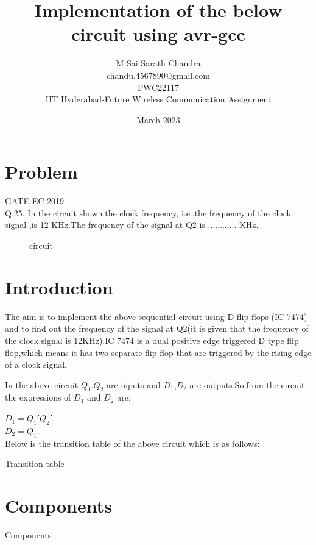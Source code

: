 \documentclass{article}
\title{Implementation of the below circuit using avr-gcc}
\date{March 2023}
\author{M Sai Sarath Chandra\\chandu.4567890@gmail.com\\FWC22117\\IIT Hyderabad-Future Wireless Communication Assignment}
\begin{document}
\maketitle
	\tableofcontents

\pagebreak

\section{Problem}
	{GATE EC-2019}\\
	Q.25. In the circuit shown,the clock frequency, i.e.,the frequency of the clock signal ,is 12 KHz.The frequency of the signal at Q2 is ............ KHz.
	\begin{figure}[h]
	\centering
		
		\caption{circuit}
		\label{fig:1}
	\end{figure}

\section{Introduction}
		
		The aim is to implement the above sequential circuit using D flip-flops (IC 7474) and to find out the frequency of the signal at Q2(it is given that the frequency of the clock signal is 12KHz).IC 7474 is a dual positive edge triggered D type flip flop,which means it has two separate flip-flop that are triggered by the rising edge of a clock signal.

		In the above circuit $Q_1$,$Q_2$ are inputs and $D_1$,$D_2$ are outputs.So,from the circuit the expressions of $D_1$ and $D_2$ are:

		$D_1 = Q_1'Q_2'$.\\
			$D_2 = Q_1$.\\

Below is the transition table of the above circuit which is as follows:

	\begin{table}[h]
		\begin{center}
			
			\caption{Transition table}
			\label{table:2}
		\end{center}
	\end{table}

\section{Components}
\pagebreak
	\begin{table}[h]
		\begin{center}
			
			\caption{Components}
			\label{table:1}
		\end{center}
	\end{table}
\end{document}
